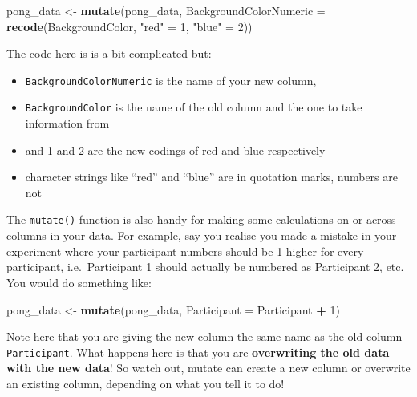 \documentclass[]{book}
\newenvironment{Shaded}{\begin{snugshade}}{\end{snugshade}}
\newcommand{\DataTypeTok}[1]{\textcolor[rgb]{0.13,0.29,0.53}{#1}}
\newcommand{\DecValTok}[1]{\textcolor[rgb]{0.00,0.00,0.81}{#1}}
\newcommand{\KeywordTok}[1]{\textcolor[rgb]{0.13,0.29,0.53}{\textbf{#1}}}
\newcommand{\NormalTok}[1]{#1}
\newcommand{\OperatorTok}[1]{\textcolor[rgb]{0.81,0.36,0.00}{\textbf{#1}}}
\newcommand{\StringTok}[1]{\textcolor[rgb]{0.31,0.60,0.02}{#1}}
\providecommand{\tightlist}{%
  \setlength{\itemsep}{0pt}\setlength{\parskip}{0pt}}
\begin{document}
\begin{Shaded}
\begin{Highlighting}[]
\NormalTok{pong_data <-}\StringTok{ }\KeywordTok{mutate}\NormalTok{(pong_data, }
                    \DataTypeTok{BackgroundColorNumeric =} \KeywordTok{recode}\NormalTok{(BackgroundColor, }
                                                    \StringTok{"red"}\NormalTok{ =}\StringTok{ }\DecValTok{1}\NormalTok{, }
                                                    \StringTok{"blue"}\NormalTok{ =}\StringTok{ }\DecValTok{2}\NormalTok{))}
\end{Highlighting}
\end{Shaded}

The code here is is a bit complicated but:

\begin{itemize}
\tightlist
\item
  \texttt{BackgroundColorNumeric} is the name of your new column,
\item
  \texttt{BackgroundColor} is the name of the old column and the one to take information from
\item
  and 1 and 2 are the new codings of red and blue respectively
\item
  character strings like ``red'' and ``blue'' are in quotation marks, numbers are not
\end{itemize}

The \texttt{mutate()} function is also handy for making some calculations on or across columns in your data. For example, say you realise you made a mistake in your experiment where your participant numbers should be 1 higher for every participant, i.e.~Participant 1 should actually be numbered as Participant 2, etc. You would do something like:

\begin{Shaded}
\begin{Highlighting}[]
\NormalTok{pong_data <-}\StringTok{ }\KeywordTok{mutate}\NormalTok{(pong_data, }\DataTypeTok{Participant =}\NormalTok{ Participant }\OperatorTok{+}\StringTok{ }\DecValTok{1}\NormalTok{)}
\end{Highlighting}
\end{Shaded}

Note here that you are giving the new column the same name as the old column \texttt{Participant}. What happens here is that you are \textbf{overwriting the old data with the new data}! So watch out, mutate can create a new column or overwrite an existing column, depending on what you tell it to do!
\end{document}
